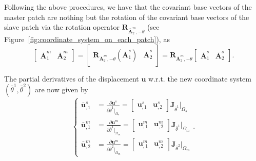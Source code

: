 Following the above procedures, we have that the covariant base vectors of the master patch are nothing but the rotation of the covariant base vectors of the slave patch via the rotation operator $\mathbf{R}_{\bar{\mathbf{A}}^m_2,-\theta}$ (see Figure~\ref{fig:coordinate_system_on_each_patch}), as
\begin{equation}
	\begin{bmatrix}
		\bar{\mathbf{A}}_1^m & \bar{\mathbf{A}}_2^m
	\end{bmatrix}
	=
	\begin{bmatrix}
		\mathbf{R}_{\bar{\mathbf{A}}^m_2,-\theta}(\bar{\mathbf{A}}_1^s) & \bar{\mathbf{A}}_2^s
	\end{bmatrix}
	=
	\mathbf{R}_{\bar{\mathbf{A}}^m_2,-\theta}
	\begin{bmatrix}
		\bar{\mathbf{A}}_1^s & \bar{\mathbf{A}}_2^s
	\end{bmatrix}.
\end{equation}

The partial derivatives of the displacement $\mathbf{u}$ w.r.t. the new coordinate system $(\bar{\theta}^1, \bar{\theta}^2)$ are now given by
\begin{equation}
	\left\{
	\begin{split}
		\bar{\mathbf{u}}^s_{,1} &= \frac{\partial \mathbf{u}^s}{\partial \bar{\theta}^1\vert_{\Omega_s}} = \begin{bmatrix}
			\mathbf{u}^s_{,1} & \mathbf{u}^s_{,2}
		\end{bmatrix}\mathbf{J}_{\bar{\theta}^1}\vert_{\Omega_s}\\
		\bar{\mathbf{u}}^m_{,1} &= \frac{\partial \mathbf{u}^m}{\partial \bar{\theta}^1\vert_{\Omega_m}} = \begin{bmatrix}
			\mathbf{u}^m_{,1} & \mathbf{u}^m_{,2}
		\end{bmatrix}\mathbf{J}_{\bar{\theta}^1}\vert_{\Omega_m}\\
		\bar{\mathbf{u}}^m_{,2} &= \frac{\partial \mathbf{u}^m}{\partial \bar{\theta}^2\vert_{\Omega_m}} = \begin{bmatrix}
			\mathbf{u}^m_{,1} & \mathbf{u}^m_{,2}
		\end{bmatrix}\mathbf{J}_{\bar{\theta}^2}\vert_{\Omega_m}
	\end{split}
	\right..
\end{equation}

